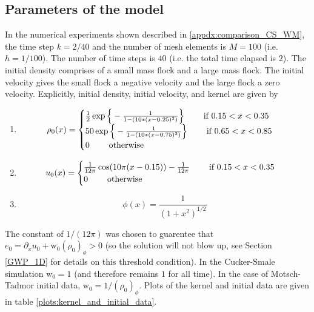 \documentclass[11pt,letterpaper]{amsart}
\theoremstyle{plain}
\theoremstyle{definition}
\theoremstyle{remark}
\def \wt {\mathrm{w}}
\begin{document}
    \subsection{Parameters of the model}
    \label{appdx:parameters}
    In the numerical experiments shown described in \ref{appdx:comparison_CS_WM}, 
    the time step $k = 2 / 40$ and the number of mesh elements is $M = 100$ (i.e. $h = 1/100$). 
    The number of time steps is $40$ (i.e. the total time elapsed is $2$). 
    The initial density comprises of a small mass flock and a large mass flock.  
    The initial velocity gives the small flock a negative velocity and the large flock a zero velocity.
    Explicitly, initial density, initial velocity, and kernel are given by 
    \begin{enumerate} 
        \item[] \[ 
            \rho_0(x) = \begin{cases} 
                    \frac{1}{2} \exp \Big\{-\frac{1}{1 - (10*(x-0.25)^2)} \Big\} \hspace{8mm} \text{if } 0.15 < x < 0.35 \\
                    50 \exp \Big\{-\frac{1}{1 - (10*(x-0.75)^2)} \Big\} \hspace{8mm} \text{if } 0.65 < x < 0.85 \\
                    0 \hspace{8mm} \text{otherwise} 
                \end{cases}
           \]
        \item[] \begin{equation*}
            u_0(x) = \begin{cases} 
                    \frac{1}{12 \pi} \cos(10 \pi (x - 0.15)) - \frac{1}{12 \pi} \hspace{8mm} \text{if } 0.15 < x < 0.35 \\
                    0 \hspace{8mm} \text{otherwise}
                \end{cases}
            \end{equation*}
        \item[] \begin{equation*}
            \phi(x) = \frac{1}{(1+x^2)^{1/2}}
        \end{equation*}
    \end{enumerate} 
    The constant of $1/(12\pi)$ was chosen to guarentee that $e_0 = \partial_x u_0 + \wt_0 (\rho_0)_{\phi} > 0$ (so the solution will not blow up, see 
    Section \ref{GWP_1D} for details on this threshold condition). 
    In the Cucker-Smale simulation $\wt_0 = 1$ (and therefore remains $1$ for all time). 
    In the case of Motsch-Tadmor initial data, $\wt_0 = 1/(\rho_0)_{\phi}$.
    Plots of the kernel and initial data are given in table \ref{plots:kernel_and_initial_data}.
\end{document}
